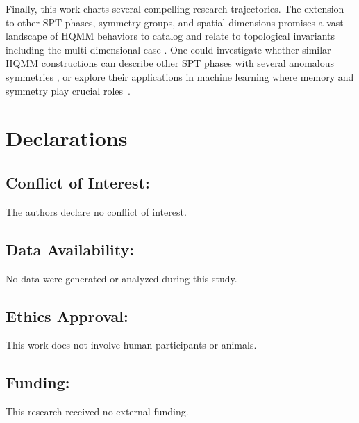 \documentclass[12pt,a4paper]{article}
\begin{document}
Finally, this work charts several compelling research trajectories.  The extension to other SPT phases, symmetry groups, and spatial dimensions promises a vast landscape of HQMM behaviors to catalog and relate to topological invariants including the multi-dimensional case \cite{ikegami2025kitaevmeetsakltcompeting}.
One could investigate whether similar HQMM constructions can describe other SPT phases with several anomalous symmetries \cite{kap25}, or explore their applications in   machine learning \cite{SSP15}  where memory and symmetry play crucial roles~\cite{Li2024,Chen24}.













\section*{Declarations}

\subsection*{Conflict of Interest:}
The authors declare no conflict of interest.

\subsection*{Data Availability:}
No data were generated or analyzed during this study.

\subsection*{Ethics Approval:}
This work does not involve human participants or animals.

\subsection*{Funding:}
This research received no external funding.





\end{document}
